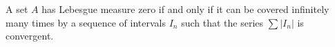 A set $A$ has Lebesgue measure zero if and only if it can be covered infinitely many times by a sequence of intervals $I_n$ such that the series $\sum |I_n|$ is convergent.
